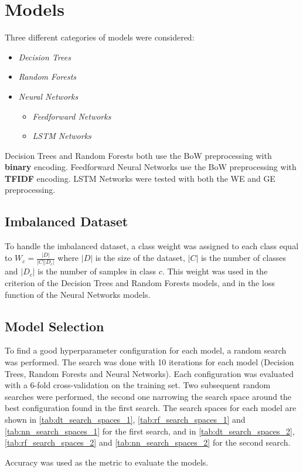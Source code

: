 \section{Models}
Three different categories of models were
considered:
\begin{itemize}
    \item \textit{Decision Trees}
    \item \textit{Random Forests}
    \item \textit{Neural Networks}
    \begin{itemize}
        \item \textit{Feedforward Networks}
        \item \textit{LSTM Networks}
    \end{itemize}
\end{itemize}
Decision Trees and Random Forests both use
the BoW preprocessing with \textbf{binary} 
encoding.
Feedforward Neural Networks use the BoW
preprocessing with \textbf{TFIDF} encoding.
LSTM Networks were tested with both the
WE and GE preprocessing.

\subsection{Imbalanced Dataset}
To handle the imbalanced dataset, a class
weight was assigned to each class equal to
$W_c=\frac{|D|}{|C||D_c|}$ where $|D|$ is
the size of the dataset, $|C|$ is the number
of classes and $|D_c|$ is the number of
samples in class $c$. This weight was used in
the criterion of the Decision Trees and Random
Forests models, and in the loss function of
the Neural Networks models.

\subsection{Model Selection}
To find a good hyperparameter configuration
for each model, a random search was performed.
The search was done with 10 iterations for
each model (Decision Trees, Random Forests 
and Neural Networks). Each configuration was
evaluated with a 6-fold cross-validation on
the training set. Two subsequent random
searches were performed, the second one
narrowing the search space around the best
configuration found in the first search.
The search spaces for each model are shown
in \autoref{tab:dt_search_spaces_1}, 
\autoref{tab:rf_search_spaces_1} and 
\autoref{tab:nn_search_spaces_1} for the 
first search, and in 
\autoref{tab:dt_search_spaces_2},
\autoref{tab:rf_search_spaces_2} and
\autoref{tab:nn_search_spaces_2} for the
second search.

%

Accuracy was used as the metric to evaluate
the models.